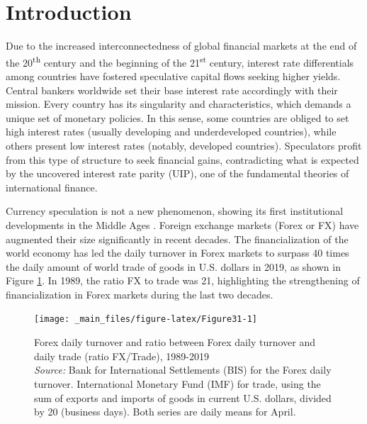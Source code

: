 \documentclass[a4paper, twoside]{templates/ociamthesis}
\begin{document}
\minitoc 

\hypertarget{threeone}{%
\section{Introduction}\label{threeone}}

\noindent Due to the increased interconnectedness of global financial markets at the end of the 20\textsuperscript{th} century and the beginning of the 21\textsuperscript{st} century, interest rate differentials among countries have fostered speculative capital flows seeking higher yields. Central bankers worldwide set their base interest rate accordingly with their mission. Every country has its singularity and characteristics, which demands a unique set of monetary policies. In this sense, some countries are obliged to set high interest rates (usually developing and underdeveloped countries), while others present low interest rates (notably, developed countries). Speculators profit from this type of structure to seek financial gains, contradicting what is expected by the uncovered interest rate parity (UIP), one of the fundamental theories of international finance.

Currency speculation is not a new phenomenon, showing its first institutional developments in the Middle Ages \autocite{accominotti2016}. Foreign exchange markets (Forex or FX) have augmented their size significantly in recent decades. The financialization of the world economy has led the daily turnover in Forex markets to surpass 40 times the daily amount of world trade of goods in U.S. dollars in 2019, as shown in Figure \ref{fig:Figure31}. In 1989, the ratio FX to trade was 21, highlighting the strengthening of financialization in Forex markets during the last two decades.

\begin{figure}[ht]

{\centering \texttt{[image: \_main\_files/figure-latex/Figure31-1]} 

}

\caption[Forex daily turnover and ratio between Forex daily turnover and daily trade (ratio FX/Trade), 1989-2019]{Forex daily turnover and ratio between Forex daily turnover and daily trade (ratio FX/Trade), 1989-2019 \\ \scriptsize \textit{Source:} Bank for International Settlements (BIS) for the Forex daily turnover. International Monetary Fund (IMF) for trade, using the sum of exports and imports of goods in current U.S. dollars, divided by 20 (business days). Both series are daily means for April.}\label{fig:Figure31}
\end{figure}
\end{document}
